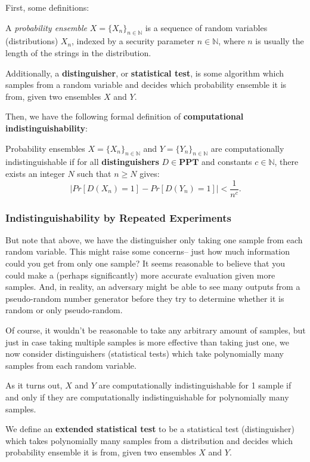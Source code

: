 \documentclass[11pt]{article}
\newcommand{\PPT}{\mathbf{PPT}}
\newcommand{\N}{\mathbb{N}}
\begin{document}
First, some definitions:

A \emph{probability ensemble} \(X = \{X_n\}_{n\in\N}\) is a sequence of random variables (distributions) \(X_n\), indexed by a security parameter \(n\in\N\), where \(n\) is usually the length of the strings in the distribution. 

Additionally, a \textbf{distinguisher}, or \textbf{statistical test}, is some algorithm which samples from a random variable and decides which probability ensemble it is from, given two ensembles \(X\) and \(Y\). \smallskip

Then, we have the following formal definition of \textbf{computational indistinguishability}:\smallskip

Probability ensembles \(X = \{X_n\}_{n\in\N}\) and \(Y=\{Y_n\}_{n\in\N}\) are computationally indistinguishable if for all \textbf{distinguishers} \(D\in\PPT\) and constants \(c\in\N\), there exists an integer \(N\) such that \(n\ge N\) gives:
\[| Pr[D(X_n)=1]-Pr[D(Y_n)=1] | <\frac{1}{n^c}.\]


\newpage
\subsubsection{Indistinguishability by Repeated Experiments}
But note that above, we have the distinguisher only taking one sample from each random variable. This might raise some concerns-- just how much information could you get from only one sample? It seems reasonable to believe that you could make a (perhaps significantly) more accurate evaluation given more samples. And, in reality, an adversary might be able to see many outputs from a pseudo-random number generator before they try to determine whether it is random or only pseudo-random.\smallskip

Of course, it wouldn't be reasonable to take any arbitrary amount of samples, but just in case taking multiple samples is more effective than taking just one, we now consider distinguishers (statistical tests) which take polynomially many samples from each random variable.\smallskip

As it turns out, \(X\) and \(Y\) are computationally indistinguishable for 1 sample if and only if they are computationally indistinguishable for polynomially many samples.\smallskip

We define an \textbf{extended statistical test} to be a statistical test (distinguisher) which takes polynomially many samples from a distribution  and decides which probability ensemble it is from, given two ensembles \(X\) and \(Y\).\smallskip
\end{document}
